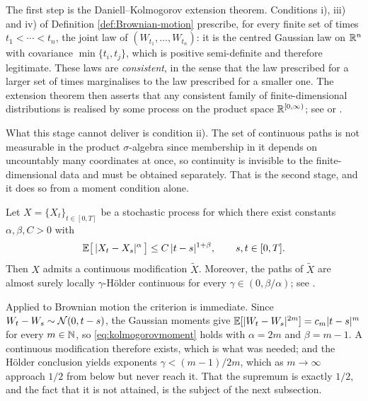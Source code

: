 The first step is the Daniell--Kolmogorov extension theorem. Conditions i), iii) and iv) of Definition 
\ref{def:Brownian-motion} prescribe, for every finite set of times $t_1 < \cdots < t_n$, the joint 
law of $(W_{t_1},\dots,W_{t_n})$: it is the centred Gaussian law on $\mathbb{R}^n$ with covariance 
$\min\{t_i,t_j\}$, which is positive semi-definite and therefore legitimate. These laws are 
\emph{consistent}, in the sense that the law prescribed for a larger set of times marginalises to 
the law prescribed for a smaller one. The 
extension theorem then asserts that any consistent family of finite-dimensional distributions is 
realised by some process on the product space $\mathbb{R}^{[0,\infty)}$; see 
\cite[Thm.\ 2.2.2]{karatzasshreve1991} or \cite[Ch.\ 8]{durrett2019}.

What this stage cannot deliver is condition ii). The set of continuous paths is not measurable in 
the product $\sigma$-algebra since membership in it depends on uncountably many coordinates at once, 
so continuity is invisible to the finite-dimensional data and must be obtained separately. That is 
the second stage, and it does so from a moment condition alone.

\begin{theorem}\label{thm:kolmogorovcontinuity}
Let $X = \{X_t\}_{t\in[0,T]}$ be a stochastic process for which there exist constants 
$\alpha, \beta, C > 0$ with
\begin{equation}\label{eq:kolmogorovmoment}
\mathbb{E}\bigl[\,|X_t - X_s|^{\alpha}\,\bigr] \leq C\,|t-s|^{1+\beta}, \qquad s,t \in [0,T].
\end{equation}
Then $X$ admits a continuous modification $\tilde{X}$. Moreover, the paths of $\tilde{X}$ are
almost surely locally $\gamma$-Hölder continuous for every $\gamma \in (0,\beta/\alpha)$; see
\cite[Thm.\ 2.2.8]{karatzasshreve1991}.
\qedopentext
\end{theorem}

Applied to Brownian motion the criterion is immediate. Since $W_t - W_s \sim \mathcal{N}(0,t-s)$, 
the Gaussian moments give $\mathbb{E}[|W_t-W_s|^{2m}] = c_m |t-s|^{m}$ for every $m \in \mathbb{N}$, 
so \eqref{eq:kolmogorovmoment} holds with $\alpha = 2m$ and $\beta = m-1$. A continuous 
modification therefore exists, which is what was needed; and the Hölder conclusion yields 
exponents $\gamma < (m-1)/2m$, which as $m \to \infty$ approach $1/2$ from below but never reach 
it. That the supremum is exactly $1/2$, and the fact that it is not attained, is the subject of the next 
subsection.

